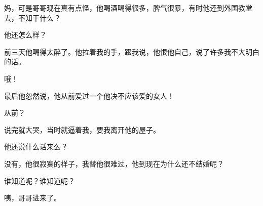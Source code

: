 妈，可是哥哥现在真有点怪，他喝酒喝得很多，脾气很暴，有时他还到外国教堂去，不知干什么？

他还怎么样？

前三天他喝得太醉了。他拉着我的手，跟我说，他恨他自己，说了许多我不大明白的话。

哦！

最后他忽然说，他从前爱过一个他决不应该爱的女人！

从前？

说完就大哭，当时就逼着我，要我离开他的屋子。

他还说什么话来么？

没有，他很寂寞的样子，我替他很难过，他到现在为什么还不结婚呢？

谁知道呢？谁知道呢？

咦，哥哥进来了。

